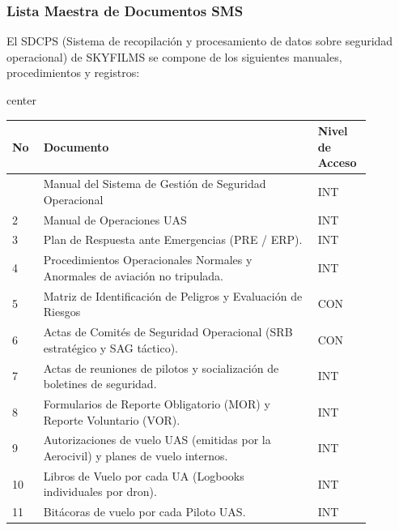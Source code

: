 \subsubsection{Lista Maestra de Documentos SMS}
El SDCPS (Sistema de recopilación y procesamiento de datos sobre seguridad operacional) de SKYFILMS se compone de los siguientes manuales, procedimientos y registros:

\begin{table}[H]
\begin{adjustbox}{center}
\begin{tabular}{|>{\centering\arraybackslash}m{0.08\linewidth}|m{0.70\linewidth}|>{\centering\arraybackslash}m{0.1\linewidth}|}
\hline
\rowcolor{gray!20}
\textbf{No} & \textbf{Documento} & \textbf{Nivel de Acceso} \\
\hline

1 & Manual del Sistema de Gestión de Seguridad Operacional & INT \\
\hline

2 & Manual de Operaciones UAS & INT  \\
\hline

3 & Plan de Respuesta ante Emergencias (PRE / ERP). & INT  \\
\hline

4 & Procedimientos Operacionales Normales y Anormales de aviación no tripulada. & INT \\
\hline

5 & Matriz de Identificación de Peligros y Evaluación de Riesgos & CON \\
\hline

6 & Actas de Comités de Seguridad Operacional (SRB estratégico y SAG táctico). & CON  \\
\hline

7 & Actas de reuniones de pilotos y socialización de boletines de seguridad. & INT \\
\hline

8 & Formularios de Reporte Obligatorio (MOR) y Reporte Voluntario (VOR). & INT \\
\hline

9 & Autorizaciones de vuelo UAS (emitidas por la Aerocivil) y planes de vuelo internos. & INT \\
\hline

10 & Libros de Vuelo por cada UA (Logbooks individuales por dron). & INT \\
\hline

11 & Bitácoras de vuelo por cada Piloto UAS. & INT \\
\hline


\end{tabular}
\end{adjustbox}
\end{table}

